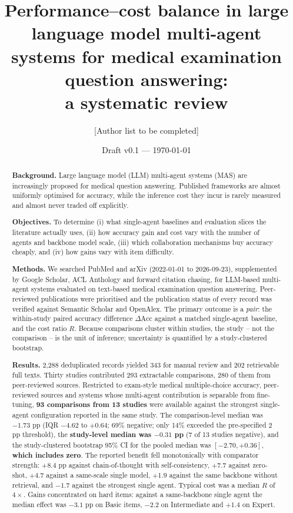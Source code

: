 \documentclass[11pt,a4paper]{article}
\title{\textbf{Performance--cost balance in large language model multi-agent
systems for medical examination question answering:\\ a systematic review}}
\author{[Author list to be completed]}
\date{Draft v0.1 --- \today}
\begin{document}
\maketitle

\begin{abstract}
\noindent\textbf{Background.} Large language model (LLM) multi-agent systems (MAS) are
increasingly proposed for medical question answering. Published frameworks are almost
uniformly optimised for accuracy, while the inference cost they incur is rarely measured and
almost never traded off explicitly.

\noindent\textbf{Objectives.} To determine (i) what single-agent baselines and evaluation
slices the literature actually uses, (ii) how accuracy gain and cost vary with the number of
agents and backbone model scale, (iii) which collaboration mechanisms buy accuracy cheaply,
and (iv) how gains vary with item difficulty.

\noindent\textbf{Methods.} We searched PubMed and arXiv (2022-01-01 to 2026-09-23),
supplemented by Google Scholar, ACL Anthology and forward citation chasing, for LLM-based
multi-agent systems evaluated on text-based medical examination question answering.
Peer-reviewed publications were prioritised and the publication status of every record was
verified against Semantic Scholar and OpenAlex. The primary outcome is a \emph{pair}: the
within-study paired accuracy difference $\Delta\mathrm{Acc}$ against a matched single-agent
baseline, and the cost ratio $R$. Because comparisons cluster within studies, the study --
not the comparison -- is the unit of inference; uncertainty is quantified by a
study-clustered bootstrap.

\noindent\textbf{Results.} 2{,}288 deduplicated records yielded 343 for manual review and
202 retrievable full texts. Thirty studies contributed 293 extractable comparisons, 280 of
them from peer-reviewed sources. Restricted to exam-style medical multiple-choice accuracy,
peer-reviewed sources and systems whose multi-agent contribution is separable from
fine-tuning, \textbf{93 comparisons from 13 studies} were available against the strongest
single-agent configuration reported in the same study. The comparison-level median was
$-1.73$ pp (IQR $-4.62$ to $+0.64$; 69\% negative; only 14\% exceeded the pre-specified
2 pp threshold), the \textbf{study-level median was $-0.31$ pp} (7 of 13 studies negative),
and the study-clustered bootstrap 95\% CI for the pooled median was
$\mathbf{[-2.70, +0.36]}$, \textbf{which includes zero}. The reported benefit fell
monotonically with comparator strength: $+8.4$ pp against chain-of-thought with
self-consistency, $+7.7$ against zero-shot, $+4.7$ against a same-scale single model,
$+1.9$ against the same backbone without retrieval, and $-1.7$ against the strongest single
agent. Typical cost was a median $R$ of $4\times$. Gains concentrated on hard items: against
a same-backbone single agent the median effect was $-3.1$ pp on Basic items, $-2.2$ on
Intermediate and $+1.4$ on Expert.


\end{abstract}
\end{document}
